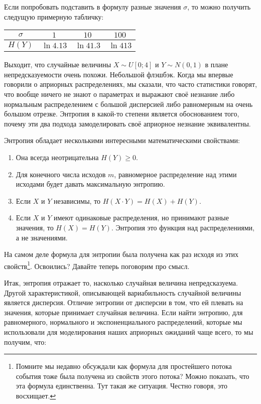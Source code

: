 Если попробовать подставить в формулу разные значения $\sigma$, то можно получить следущую примерную табличку: 

\begin{center}
	\begin{tabular}{c|c|c|c}
		$\sigma$ & $1$ & $10$  &  $100$  \\ \hline
		$H(Y)$ & $\ln 4.13 $ & $\ln 41.3 $  & $\ln 413 $
	\end{tabular}
\end{center}

Выходит, что случайные величины $X \sim U[0;4]$ и $Y \sim N(0,1)$ в плане непредсказуемости очень похожи. Небольшой флэшбэк. Когда мы впервые говорили о априорных распределениях, мы сказали, что часто статистики говорят, что вообще ничего не знают о параметрах и выражают своё незнание либо нормальным распределением с большой дисперсией либо равномерным на очень большом отрезке. Энтропия в какой-то степени является обоснованием того, почему эти два подхода замоделировать своё априорное незнание эквивалентны. 

Энтропия обладает несколькими интересными математическими свойствами:

\begin{enumerate}
	\item  Она всегда неотрицательна $H(Y) \ge 0$.
	
	\item  Для конечного числа исходов $m$, равномерное распределение над этими исходами будет давать максимальную энтропию. 
		
	\item Если $X$ и $Y$ независимы, то $H(X \cdot Y) = H(X) + H(Y)$. 
	
	\item Если $X$ и $Y$ имеют одинаковые распределения, но принимают разные значения, то $H(X) = H(Y)$. Энтропия это функция над распределениями, а не значениями. 
\end{enumerate}

На самом деле формула для энтропии была получена как раз исходя из этих свойств\footnote{Помните мы недавно обсуждали как формула для простейшего потока события тоже была получена из свойств этого потока? Можно показать, что эта формула единственна. Тут такая же ситуация. Честно говоря, это восхищает.}.  Освоились? Давайте теперь поговорим про смысл. 

Итак, энтропия отражает то, насколько случайная величина непредсказуема. Другой характеристикой, описывающей вариабильность случайной величины является дисперсия. Отличие энтропии от дисперсии в том, что ей плевать на значения, которые принимает случайная величина. Если найти энтропию, для равномерного, нормального и экспоненциального распределений, которые мы использовали для моделирования наших априорных ожиданий чаще всего, то мы получим, что:

